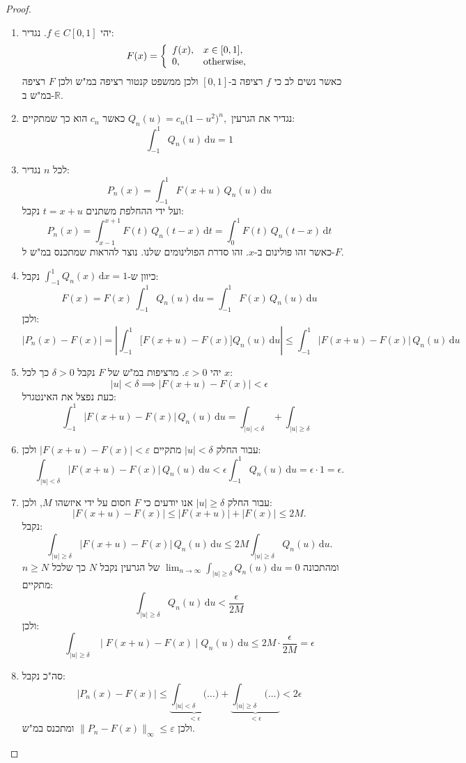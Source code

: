 \documentclass{tstextbook}
\begin{document}
\begin{proof}
  \begin{enumerate}
    \item יהי \(f \in C[0,1]\). נגדיר: 
$$F(x)={\left\{\begin{array}{l l}{f(x),}&{x\in[0,1],}\\ {0,}&{{\mathrm{otherwise}},}\end{array}\right.}$$
כאשר נשים לב כי \(f\) רציפה ב-\([0,1]\) ולכן ממשפט קנטור רציפה במ"ש ולכן \(F\) רציפה במ"ש ב-\(\mathbb{R}\).


    \item נגדיר את הגרעין \(Q_{n}(u)=c_{n}{{\bigl(}1-u^{2}{\bigr)}^{n}},\) כאשר \(c_{n}\) הוא כך שמתקיים: 
$$\int_{-1}^{1}Q_{n}(u)\,\mathrm{d}u=1$$


    \item לכל \(n\) נגדיר: 
$$P_{n}(x)=\int_{-1}^{1}F(x+u)\,Q_{n}(u)\,\mathrm{d}u$$
ועל ידי ההחלפת משתנים \(t=x+u\) נקבל:
$$P_{n}(x)=\int_{x-1}^{x+1}F(t)\,Q_{n}(t-x)\,\mathrm{d}t=\int_{0}^{1}F(t)\,Q_{n}(t-x)\,\mathrm{d}t$$
כאשר זהו פולינום ב-\(x\). זהו סדרת הפולינומים שלנו. נוצר להראות שמתכנס במ"ש ל-\(F\).


    \item כיוון ש-\(\int_{-1}^{1} Q_{n}(x) \, \mathrm{d}x=1\) נקבל: 
$$F(x)=F(x)\,\int_{-1}^{1}Q_{n}(u)\,\mathrm{d}u=\int_{-1}^{1}F(x)\,Q_{n}(u)\,\mathrm{d}u$$
ולכן:
$$\left|P_{n}(x)-F(x)\right|=\left|\int_{-1}^{1}\bigl[F(x+u)-F(x)\bigr]Q_{n}(u)\,\mathrm{d}u\right|\leq\int_{-1}^{1}\bigl|F(x+u)-F(x)\bigr|\,Q_{n}(u)\,\mathrm{d}u$$


    \item יהי \(\varepsilon> 0\). מרציפות במ"ש של \(F\) נקבל \(\delta > 0\) כך לכל \(x\): 
$$|u|<\delta\implies|F(x+u)-F(x)|<\epsilon$$
כעת נפצל את האינטגרל:
$$\int_{-1}^{1}\!|F(x+u)-F(x)|\,Q_{n}(u)\,\mathrm{d}u=\int_{|u|<\delta}+\int_{|u|\geq\delta}$$


    \item עבור החלק \(\lvert u \rvert<\delta\) מתקיים \(\lvert F(x+u)-F(x) \rvert<\varepsilon\) ולכן: 
$$\int_{|u|<\delta}|F(x+u)-F(x)|\,Q_{n}(u)\,\mathrm{d}u<\epsilon\int_{-1}^{1}Q_{n}(u)\,\mathrm{d}u=\epsilon\cdot1=\epsilon.$$


    \item עבור החלק \(\lvert u \rvert\geq \delta\) אנו יודעים כי \(F\) חסום על ידי איזשהו \(M\), ולכן: 
$$|F(x+u)-F(x)|\leq|F(x+u)|+|F(x)|\leq2M.$$
נקבל:
$$\int_{|u|\geq\delta}|F(x+u)-F(x)|\,Q_{n}(u)\,\mathrm{d}u\leq2M\int_{|u|\geq\delta}Q_{n}(u)\,\mathrm{d}u.$$
ומהתכונה \(\operatorname*{lim}_{n\to\infty}\int_{|u|\geq\delta}Q_{n}(u)\,\mathrm{d}u=0\) של הגרעין נקבל \(N\) כך שלכל \(n\geq N\) מתקיים:
$$\int_{|u|\geq\delta}Q_{n}(u)\,\mathrm{d}u<{\frac{\epsilon}{2M}}$$
ולכן:
$$\int_{|u|\geq\delta}\mid\!F(x+u)-F(x)\!\mid Q_{n}(u)\,\mathrm{d}u\leq2M\cdot\frac{\epsilon}{2M}=\epsilon$$


    \item סה"כ נקבל: 
$$|P_{n}(x)-F(x)|\leq\underbrace{\int_{|u|<\delta}\bigl(\dots\bigr)}_{<\epsilon}+\underbrace{\int_{|u|\geq\delta}\bigl(\dots\bigr)}_{<\epsilon}<2\epsilon$$
ולכן \(\lVert P_{n}-F(x) \rVert_{\infty}\leq \varepsilon\) ומתכנס במ"ש.


  \end{enumerate}
\end{proof}
\end{document}
